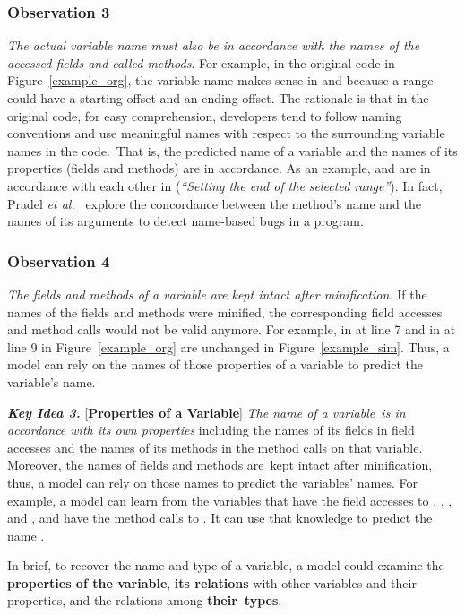 \subsubsection*{\bf Observation 3}
{\em The actual variable name must also be in accordance with the
  names of the accessed fields and called methods}. For example, in
the original code in Figure~\ref{example_org}, the variable name
 makes sense in  and
 because a range could have a starting offset
and an ending offset. The rationale is that in the original code, for
easy comprehension, developers tend to follow naming conventions and
use meaningful names with respect to the surrounding variable names in
the code.~That is, the predicted name of a variable and the names of its
properties (fields and methods) are in accordance. As an example,
 and  are in accordance with each
other in  ({\em ``Setting the end of
  the selected range''}). In fact, Pradel {\em et
  al.}~\cite{deepbugs-oopsla18} explore the concordance between the
method's name and the names of its arguments to detect name-based bugs
in a program.



\subsubsection*{\bf Observation 4}
{\em The fields and methods of a variable are
  kept intact after minification.} If the names of the fields and
methods were minified, the corresponding field accesses and method
calls would not be valid anymore. For example,  in
 at line 7 and  in
 at line 9 in Figure~\ref{example_org} are
unchanged in Figure~\ref{example_sim}. Thus, a model can rely
on the names of those properties of a variable to predict the
variable's name.

\vspace{2pt}
{\bf \em Key Idea 3.} [{\bf Properties of a Variable}] {\em The
  name of a variable~is in accordance with its own properties}
including the names of its fields in field accesses and the names of
its methods in the method calls on that variable. Moreover, the names
of fields and methods are~kept intact after minification, thus, a
model can rely on those names to predict the variables' names. For
example, a model can learn from the variables that have the field
accesses to , ,
, and , and have the method
calls to .  It can use that knowledge to
predict the name .


In brief, to recover the name and type of a variable, a model could
examine the {\bf properties of the variable}, {\bf its relations} with
other variables and their properties, and the relations among {\bf
  their~types}.















